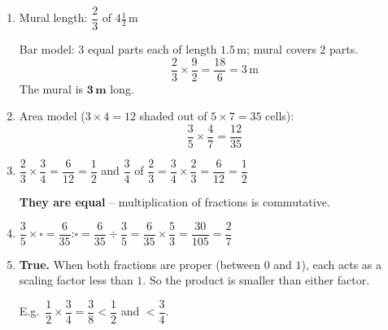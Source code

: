 \documentclass{beamer}
\begin{document}
\begin{frame}

\small
\begin{enumerate}


  \item Mural length: $\dfrac{2}{3}$ of $4\tfrac{1}{2}\,\text{m}$

  Bar model: $3$ equal parts each of length $1.5\,\text{m}$; mural covers $2$ parts.
  \[
    \frac{2}{3} \times \frac{9}{2} = \frac{18}{6} = 3\,\text{m}
  \]
  The mural is $\mathbf{3\,\text{m}}$ long.

  \item Area model ($3\times 4 = 12$ shaded out of $5\times 7 = 35$ cells):
  \[
    \frac{3}{5} \times \frac{4}{7} = \frac{12}{35}
  \]

  \item $\dfrac{2}{3}\times\dfrac{3}{4} = \dfrac{6}{12} = \dfrac{1}{2}$
  \quad and \quad
  $\dfrac{3}{4}$ of $\dfrac{2}{3} = \dfrac{3}{4}\times\dfrac{2}{3} = \dfrac{6}{12} = \dfrac{1}{2}$

  \textbf{They are equal} -- multiplication of fractions is commutative.

  \item $\dfrac{3}{5} \times \square = \dfrac{6}{35}$:\quad $\square = \dfrac{6}{35} \div \dfrac{3}{5} = \dfrac{6}{35}\times\dfrac{5}{3} = \dfrac{30}{105} = \dfrac{2}{7}$

  \item \textbf{True.} When both fractions are proper (between $0$ and $1$), each acts as a scaling factor less than $1$. So the product is smaller than either factor.

  E.g.\ $\dfrac{1}{2}\times\dfrac{3}{4} = \dfrac{3}{8} < \dfrac{1}{2}$ and $< \dfrac{3}{4}$.

\end{enumerate}
\end{frame}
\end{document}
